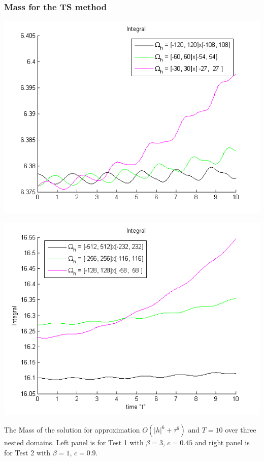 \documentclass{beamer}
\begin{document}


\begin{frame}
\frametitle{Mass for the TS method}

\begin{center}\vspace{0.4cm}
	\begin{minipage}[b]{0.49\linewidth}
		\includegraphics[width=\linewidth]{figures/MassTaylor_120_60_30_ZB1_bt3_c045_h020_O(h^6).png}
	\end{minipage}	
	\begin{minipage}[b]{0.49\linewidth}
		\includegraphics[width=\linewidth]{figures/MassTaylor_512_256_128_ZB1_bt1_c090_h040_O(h^6).png}
		
	\end{minipage}
\end{center}
The Mass of the solution for approximation $O(|h|^6 + \tau^6)$ and $T = 10$ over three nested domains. Left panel is for Test 1 with $\beta=3$, $c = 0.45$ and right panel is for Test 2 with $\beta=1$, $c = 0.9$.
\end{frame}
\end{document}

